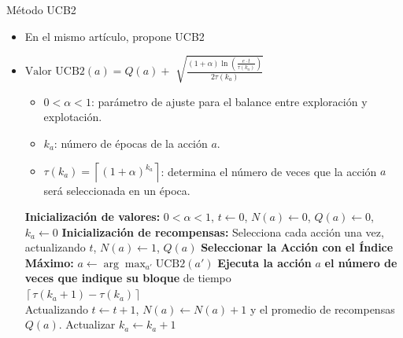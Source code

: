 \documentclass[10pt, envcountsect, handout, aspectratio=1610, hyperref={hypertexnames=true}]{beamer}
\begin{document}
\begin{frame}{Método UCB2}

\begin{itemize}
\item En el mismo artículo, \cite{Auer2002} propone UCB2
\item $\text{Valor UCB2}(a) = Q(a) +$ \Large $\sqrt{\frac{(1 + \alpha) \ln \left(\frac{e\cdot t}{\tau(k_a)}\right)}{2 \tau(k_a)}}$
    \begin{itemize}
        \item \( 0<\alpha<1 \): parámetro de ajuste para el balance entre exploración y explotación.
		\item \( k_a \): número de épocas de la  acción \( a \).
        \item \( \tau(k_a) = \left\lceil (1 + \alpha)^{k_a} \right\rceil  \): determina el número de veces que la acción \( a \) será seleccionada en un época.
    \end{itemize}


\hfil
\begin{minipage}{.8\textwidth}
\begin{algorithm}[H]	
\caption{Algoritmo UCB2}
\label{alg:UCB2}
	
\begin{algorithmic}[1]  \small
    \STATE \textbf{Inicialización de valores:} $0<\alpha<1$, $t \gets 0$, $N(a) \gets 0$, $Q(a) \gets 0$, $k_a \gets 0$
    \STATE \textbf{Inicialización de recompensas:} Selecciona cada acción una vez, actualizando $t$, $N(a) \gets 1$, $Q(a)$
        \STATE \textbf{Seleccionar la Acción con el Índice Máximo:} \( a \gets \arg \max_{a'} \text{UCB2}(a') \)
        \STATE \textbf{Ejecuta la acción} $a$ \textbf{el número de veces que indique su bloque} de tiempo \\ \hfil \( \left\lceil \tau(k_a + 1) - \tau(k_a) \right\rceil \) \\ Actualizando $t \gets t + 1$, $N(a) \gets N(a) + 1$ y el promedio de recompensas \( Q(a) \).
        \STATE Actualizar $k_a \gets k_a + 1$
    \ENDWHILE
\end{algorithmic}
\end{algorithm}
\end{minipage}


\end{itemize}

\end{frame}
\end{document}
